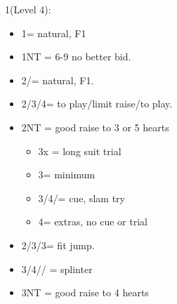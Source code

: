 \documentclass[a4paper,14pt]{extarticle}
\begin{document}
\begin{itemize}
{\color{CadetBlue}
\item 1\hearts (Level 4):
	\begin{itemize}
	\item 1\spades = natural, F1
   \item 1NT = 6-9 no better bid.
   \item 2\clubs/\diamonds = natural, F1.
   \item 2\hearts/3\hearts/4\hearts = to play/limit raise/to play.
   \item 2NT = good raise to 3 or 5 hearts
		\begin{itemize}
		\item 3x = long suit trial
		\item 3\hearts = minimum
		\item 3\spades/4\clubs/\diamonds = cue, slam try
		\item 4\hearts = extras, no cue or trial
		\end{itemize}
   \item 2\spades/3\clubs/3\diamonds = fit jump.
   \item 3\spades/4\clubs/\diamonds/ = splinter
	\item 3NT = good raise to 4 hearts
	\end{itemize}
}


\end{itemize}
\end{document}
